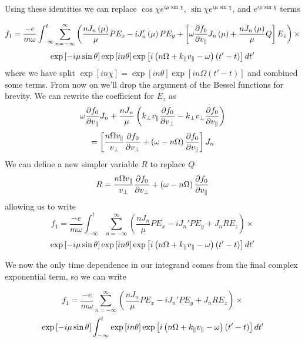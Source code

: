 Using these identities we can replace $\cos\chi e^{i\mu\sin\chi}$, $\sin\chi e^{i\mu\sin\chi}$, and $e^{i\mu\sin\chi}$ terms

\begin{equation*}
	f_1 = \frac{-e}{m \omega} \int_{-\infty}^t \sum_{n=-\infty}^\infty \left(\frac{nJ_n\left(\mu\right)}{\mu} P E_x - i J_n' \left(\mu\right) P E_y + \left[\omega \frac{\partial f_0}{\partial v_\parallel} J_n\left(\mu\right) + \frac{nJ_n\left(\mu\right)}{\mu} Q\right]E_z \right) \times
\end{equation*}
\begin{equation}
	\exp \left[-i\mu \sin\theta \right] \exp \left[in \theta \right] \exp \left[i\left(n\Omega + k_\parallel v_\parallel - \omega\right) \left(t' - t\right)\right] dt'
\end{equation}
where we have split $\exp \left[in\chi\right] = \exp \left[in\theta \right] \exp \left[in\Omega \left(t' - t\right)\right]$ and combined some terms. From now on we'll drop the argument of the Bessel functions for brevity. We can rewrite the coefficient for $E_z$ as
\begin{equation*}
	\omega \frac{\partial f_0}{\partial v_\parallel} J_n + \frac{nJ_n}{\mu} \left( k_\perp v_\parallel\frac{\partial f_0}{\partial v_\perp} - k_\perp v_\perp\frac{\partial f_0}{\partial v_\parallel} \right)
\end{equation*}
\begin{equation}
	 = \left[ \frac{n\Omega v_\parallel}{v_\perp} \frac{\partial f_0}{\partial v_\perp} + \left(\omega - n\Omega\right) \frac{\partial f_0}{\partial v_\parallel} \right] J_n
\end{equation}
We can define a new simpler variable $R$ to replace $Q$
\begin{equation}
	R = \frac{n\Omega v_\parallel}{v_\perp} \frac{\partial f_0}{\partial v_\perp} + \left(\omega - n\Omega\right) \frac{\partial f_0}{\partial v_\parallel}
\end{equation}
allowing us to write
\begin{equation*}
	f_1 = \frac{-e}{m \omega} \int_{-\infty}^t \sum_{n=-\infty}^\infty \left(\frac{nJ_n}{\mu} P E_x - i J_n' P E_y + J_n R E_z \right) \times
\end{equation*}
\begin{equation}
	\exp \left[-i\mu \sin\theta \right] \exp \left[in \theta \right] \exp \left[i\left(n\Omega + k_\parallel v_\parallel - \omega\right) \left(t' - t\right)\right] dt'
\end{equation}

We now the only time dependence in our integrand comes from the final complex exponential term, so we can write

\begin{equation*}
	f_1 = \frac{-e}{m \omega} \sum_{n=-\infty}^\infty \left(\frac{nJ_n}{\mu} P E_x - i J_n' P E_y + J_n R E_z \right) \times
\end{equation*}
\begin{equation}
	\exp \left[-i\mu \sin\theta \right] \int_{-\infty}^t \exp \left[in \theta \right] \exp \left[i\left(n\Omega + k_\parallel v_\parallel - \omega\right) \left(t' - t\right)\right] dt'
\end{equation}

